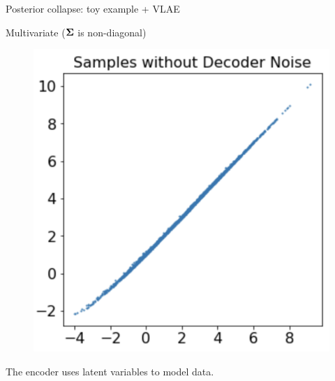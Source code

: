 \begin{frame}{Posterior collapse: toy example + VLAE}
\begin{block}{Multivariate ($\boldsymbol{\Sigma}$ is non-diagonal)}
\begin{minipage}[t]{0.33\columnwidth}
\begin{figure}[h]
			\end{figure}
		\end{minipage}%
		\begin{minipage}[t]{0.33\columnwidth}
			\begin{figure}[h]
				\centering
				\includegraphics[width=.75\linewidth]{figs/posterior_collapse_toy_5.png}
			\end{figure}
		\end{minipage}
		The encoder uses latent variables to model data.
	\end{block}
	

\end{frame}

